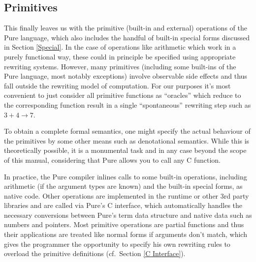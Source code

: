 \documentclass[a4paper,12pt]{article}
\begin{document}
\subsection{Primitives}

This finally leaves us with the primitive (built-in and external) operations of the Pure language, which also includes the handful of built-in special forms discussed in Section \ref{Special}. In the case of operations like arithmetic which work in a purely functional way, these could in principle be specified using appropriate rewriting systems. However, many primitives (including some built-ins of the Pure language, most notably exceptions) involve observable side effects and thus fall outside the rewriting model of computation. For our purposes it's most convenient to just consider all primitive functions as ``oracles'' which reduce to the corresponding function result in a single ``spontaneous'' rewriting step such as $3+4\rightarrow 7$.

To obtain a complete formal semantics, one might specify the actual behaviour of the primitives by some other means such as denotational semantics. While this is theoretically possible, it is a monumental task and in any case beyond the scope of this manual, considering that Pure allows you to call any C function.

In practice, the Pure compiler inlines calls to some built-in operations, including arithmetic (if the argument types are known) and the built-in special forms, as native code. Other operations are implemented in the runtime or other 3rd party libraries and are called via Pure's C interface, which automatically handles the necessary conversions between Pure's term data structure and native data such as numbers and pointers. Most primitive operations are partial functions and thus their applications are treated like normal forms if arguments don't match, which gives the programmer the opportunity to specify his own rewriting rules to overload the primitive definitions (cf.\ Section \ref{C Interface}).
\end{document}
